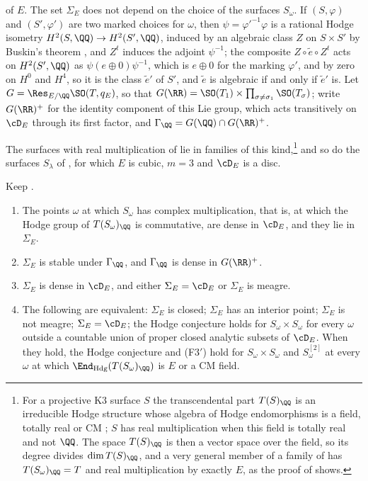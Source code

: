 \begin{setupenv}
of $E$. The set $\Sigma_{E}$ does not depend on the choice of the surfaces
$S_{\omega}$. If $(S,\varphi)$ and $(S',\varphi')$ are two marked choices
for $\omega$, then $\psi=\varphi'^{-1}\varphi$ is a rational Hodge isometry
$H^{2}(S,\QQ)\to H^{2}(S',\QQ)$, induced by an algebraic class $Z$ on
$S\times S'$ by Buskin's theorem \cite{Bus19}, and $Z^{t}$ induces the
adjoint $\psi^{-1}$; the composite $Z\circ\tilde e\circ Z^{t}$ acts on
$H^{2}(S',\QQ)$ as $\psi(e\oplus0)\psi^{-1}$, which is $e\oplus0$ for the
marking $\varphi'$, and by zero on $H^{0}$ and $H^{4}$, so it is the class
$\tilde e'$ of $S'$, and $\tilde e$ is algebraic if and only if $\tilde e'$
is. Let $G=\Res_{E/\QQ}\SO(T,q_{E})$, so that
$G(\RR)=\SO(T_{1})\times\prod_{\sigma\ne\sigma_{1}}\SO(T_{\sigma})$; write
$G(\RR)^{+}$ for the identity component of this Lie group, which acts
transitively on $\cD_{E}$ through its first factor, and
$\Gamma_{\QQ}=G(\QQ)\cap G(\RR)^{+}$.
\end{setupenv}

The surfaces with real multiplication of \cite{vG08,vGS25} lie in families
of this kind,\footnote{For a projective K3 surface $S$ the transcendental
part $T(S)_{\QQ}$ is an irreducible Hodge structure whose algebra of Hodge
endomorphisms is a field, totally real or CM \cite{Zar83}; $S$ has real
multiplication when this field is totally real and not $\QQ$. The space
$T(S)_{\QQ}$ is then a vector space over the field, so its degree divides
$\dim T(S)_{\QQ}$, and a very general member of a family of
 has $T(S_{\omega})_{\QQ}=T$ and real multiplication by
exactly $E$, as the proof of  shows.} and so do the surfaces $S_{\lambda}$ of ,
for which $E$ is cubic, $m=3$ and $\cD_{E}$ is a disc.

\begin{theorem}
\label{thm:rmlocus}
Keep .
\begin{enumerate}[label=\textup{(\roman*)},leftmargin=2.6em,itemsep=2pt]
\item The points $\omega$ at which $S_{\omega}$ has complex multiplication,
  that is, at which the Hodge group of $T(S_{\omega})_{\QQ}$ is commutative,
  are dense in $\cD_{E}$, and they lie in $\Sigma_{E}$.
\item $\Sigma_{E}$ is stable under $\Gamma_{\QQ}$, and $\Gamma_{\QQ}$ is dense
  in $G(\RR)^{+}$.
\item $\Sigma_{E}$ is dense in $\cD_{E}$, and either $\Sigma_{E}=\cD_{E}$ or
  $\Sigma_{E}$ is meagre.
\item The following are equivalent: $\Sigma_{E}$ is closed; $\Sigma_{E}$ has
  an interior point; $\Sigma_{E}$ is not meagre; $\Sigma_{E}=\cD_{E}$; the
  Hodge conjecture holds for $S_{\omega}\times S_{\omega}$ for every $\omega$
  outside a countable union of proper closed analytic subsets of $\cD_{E}$.
  When they hold, the Hodge conjecture and \textup{(F3$'$)} hold for
  $S_{\omega}\times S_{\omega}$ and $S_{\omega}^{[2]}$ at every $\omega$ at
  which $\End_{\mathrm{Hdg}}(T(S_{\omega})_{\QQ})$ is $E$ or a CM field.
\end{enumerate}
\end{theorem}


